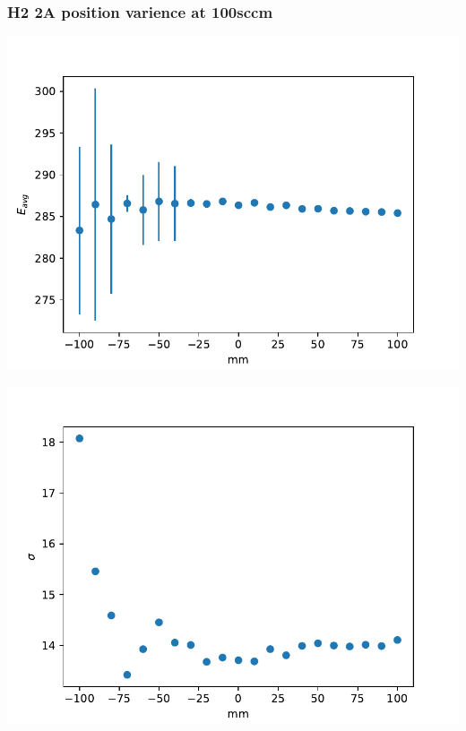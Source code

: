 \documentclass{beamer} %
\begin{document}
\begin{frame}
    \frametitle{H2 2A position varience at 100sccm}
    \begin{minipage}{0.49\textwidth}
        \includegraphics[width=1.1\textwidth]{figures/PosVary_H2_2A_Energy_werrors.pdf}
    \end{minipage}
    \begin{minipage}{0.49\textwidth}
        \includegraphics[width=1.1\textwidth]{figures/PosVary_H2_2A_Energy_sigma.pdf}
    \end{minipage}
    \begin{minipage}{0.49\textwidth}

\end{minipage}
\end{frame}
\end{document}
